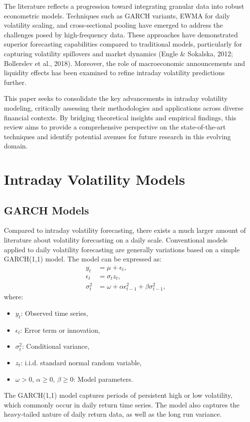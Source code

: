 \documentclass[12pt,a4paper]{article}
\begin{document}
The literature reflects a progression toward integrating granular data into robust 
econometric models. Techniques such as GARCH variants, EWMA for daily volatility 
scaling, and cross-sectional pooling have emerged to address the challenges posed 
by high-frequency data. These approaches have demonstrated superior forecasting 
capabilities compared to traditional models, particularly for capturing volatility 
spillovers and market dynamics (Engle \& Sokalska, 2012; Bollerslev et al., 2018). 
Moreover, the role of macroeconomic announcements and liquidity effects has been 
examined to refine intraday volatility predictions further.

This paper seeks to consolidate the key advancements in intraday volatility modeling, 
critically assessing their methodologies and applications across diverse financial 
contexts. By bridging theoretical insights and empirical findings, this review aims 
to provide a comprehensive perspective on the state-of-the-art techniques and 
identify potential avenues for future research in this evolving domain. 

\section{Intraday Volatility Models}\label{sec2}

\subsection{GARCH Models}
Compared to intraday volatility forecasting, there exists a much larger amount of
literature about volatility forecasting on a daily scale. Conventional models
applied to daily volatility forecasting are generally variations based on a simple GARCH(1,1)
model. The model can be expressed as:
\begin{align*}
    y_t &= \mu + \epsilon_t, \\
    \epsilon_t &= \sigma_t z_t, \\
    \sigma_t^2 &= \omega + \alpha \epsilon_{t-1}^2 + \beta \sigma_{t-1}^2,
\end{align*}
where:
\begin{itemize}
    \item $y_t$: Observed time series,
    \item $\epsilon_t$: Error term or innovation,
    \item $\sigma_t^2$: Conditional variance,
    \item $z_t$: i.i.d. standard normal random variable,
    \item $\omega > 0$, $\alpha \geq 0$, $\beta \geq 0$: Model parameters.
\end{itemize}
The GARCH(1,1) model captures periods of persistent high or low volatility, which commonly occur 
in daily return time series. The model also captures the heavy-tailed nature of daily return data, as well as 
the long run variance.
\end{document}
